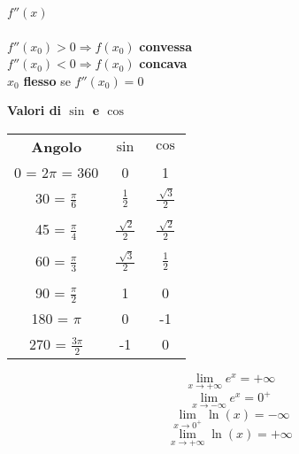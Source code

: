 \documentclass[10pt]{article}
\begin{document}
\begin{enumerate}
\begin{multicols}{2}
		$f''(x)$\\\\
		$f''(x_0) > 0 \Rightarrow f(x_0)$ \textbf{convessa}\\
		$f''(x_0) < 0 \Rightarrow f(x_0)$ \textbf{concava}\\
		$x_0$ \textbf{flesso} se $f''(x_0) = 0$
	\end{multicols}
\end{enumerate}
\begin{multicols}{2}
	\textbf{Valori di $\sin$ e $\cos$}\\
	\begin{tabular}{c | c c}
		\textbf{Angolo} & $\sin$ & $\cos$ \\
		0 = 2$\pi$ = 360 & 0 & 1 \\
		30 = $\frac{\pi}{6}$ & $\frac{1}{2}$ & $\frac{\sqrt[]{3}}{2}$ \\\\
		45 = $\frac{\pi}{4}$ & $\frac{\sqrt[]{2}}{2}$ & $\frac{\sqrt[]{2}}{2}$ \\\\
		60 = $\frac{\pi}{3}$ & $\frac{\sqrt[]{3}}{2}$ & $\frac{1}{2}$ \\\\
		90 = $\frac{\pi}{2}$ & 1 & 0 \\
		180 = $\pi$ & 0 & -1 \\
		270 = $\frac{3\pi}{2}$ & -1 & 0 \\
	\end{tabular}
	\columnbreak
	
	$$\lim_{x\to+\infty} e^x = +\infty$$
	$$\lim_{x\to-\infty} e^x = 0^+$$
	$$\lim_{x\to0^+} \ln(x) = -\infty$$
	$$\lim_{x\to+\infty} \ln(x) = +\infty$$
\end{multicols}
\end{document}
